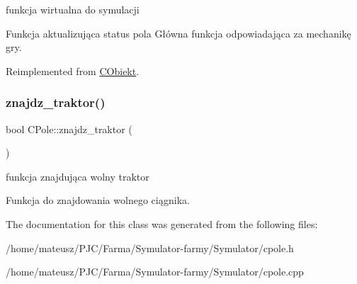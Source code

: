 funkcja wirtualna do symulacji 

Funkcja aktualizująca status pola Główna funkcja odpowiadająca za mechanikę gry. 

Reimplemented from \mbox{\hyperlink{class_c_obiekt}{C\+Obiekt}}.

\mbox{\label{class_c_pole_a2272e326d39402016cf59132a5af78cf}} 
\subsubsection{\texorpdfstring{znajdz\+\_\+traktor()}{znajdz\_traktor()}}
{\footnotesize\ttfamily bool C\+Pole\+::znajdz\+\_\+traktor (\begin{DoxyParamCaption}{ }\end{DoxyParamCaption})}



funkcja znajdująca wolny traktor 

Funkcja do znajdowania wolnego ciągnika.

The documentation for this class was generated from the following files\+:\begin{DoxyCompactItemize}
\item 
/home/mateusz/\+P\+J\+C/\+Farma/\+Symulator-\/farmy/\+Symulator/cpole.\+h\item 
/home/mateusz/\+P\+J\+C/\+Farma/\+Symulator-\/farmy/\+Symulator/cpole.\+cpp\end{DoxyCompactItemize}
